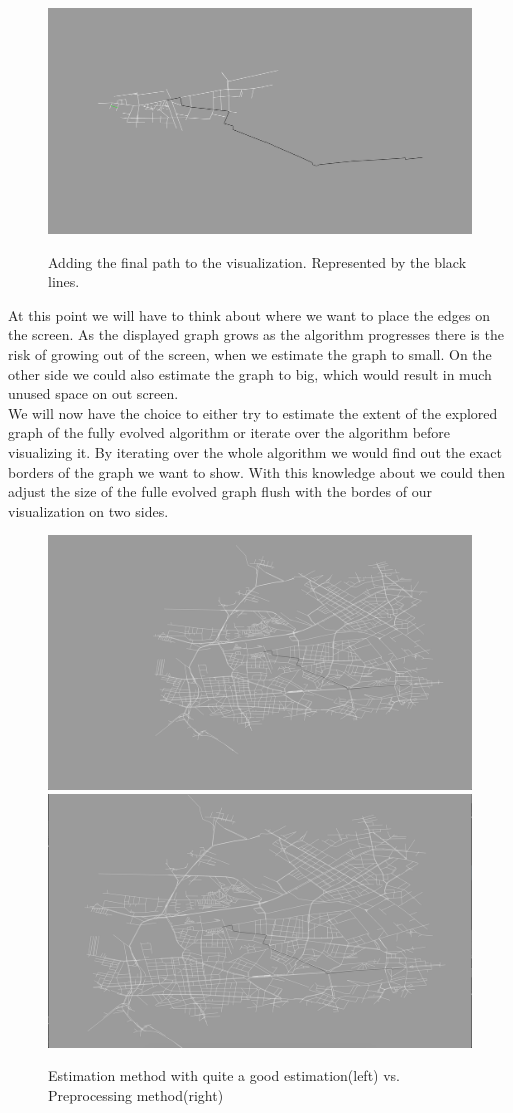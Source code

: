 \documentclass
[
	paper = a4,
    pagesize,
	12 pt,
	oneside,                       %
    open = right,
	DIV = calc,
	BCOR = 0 mm,                   %
	bibtotoc
]
{scrbook}
\begin{document}
\begin{figure}[H]
 \
 \includegraphics[width=\textwidth]{Images/vis-result-path.png}
\caption[]{Adding the final path to the visualization. Represented by the black lines.}
\label{fig:result-path}
\end{figure}

At this point we will have to think about where we want to place the edges on the screen.
As the displayed graph grows as the algorithm progresses there is the risk of growing out of the screen, when we estimate the graph to small.
On the other side we could also estimate the graph to big, which would result in much unused space on out screen.\\
We will now have the choice to either try to estimate the extent of the explored graph of the fully evolved algorithm or iterate over the algorithm before visualizing it.
By iterating over the whole algorithm we would find out the exact borders of the graph we want to show.
With this knowledge about we could then adjust the size of the fulle evolved graph flush with the bordes of our visualization on two sides.

\begin{figure}[H]
	\includegraphics[width=.5\textwidth]{Images/vis-estimation.png}
	\includegraphics[width=.5\textwidth]{Images/vis-preprocessing.png}
\caption[]{Estimation method with quite a good estimation(left) vs. Preprocessing method(right)}
\label{fig:sections}
\end{figure}
\end{document}
